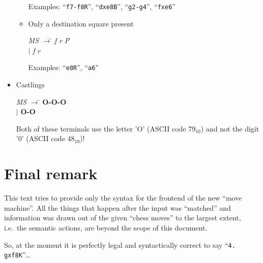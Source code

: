 \documentclass[a4paper]{article}
\def\base#1{$_{\scriptscriptstyle #1}$}
\def\bnf#1{\textit{#1}}
\def\bnfterm#1{\textbf{#1}}
\def\bnfprod{$\rightarrow$}
\def\bnfor{$|$}
\begin{document}
\begin{itemize}
\begin{itemize}
Examples: ``\texttt{f7-f8R}'', ``\texttt{dxe8B}'', ``\texttt{g2-g4}'', 
``\texttt{fxe6}''
\item Only a destination square present

\begin{center}
\begin{minipage}{3cm}
\begin{tabbing}
\bnf{MS} \bnfprod\={} \bnf{f} \bnf{r} \bnf{P}\\
 \>\bnfor{} \bnf{f} \bnf{r}
\end{tabbing}
\end{minipage}
\end{center}

Examples: ``\texttt{e8R}'', ``\texttt{a6}''
\end{itemize}


\item Castlings

\begin{center}
\begin{minipage}{3cm}
\begin{tabbing}
\bnf{MS} \bnfprod\={} \bnfterm{O-O-O}\\
 \>\bnfor{} \bnfterm{O-O}
\end{tabbing}
\end{minipage}
\end{center}

Both of these terminals use the letter 'O' (ASCII code 
79\base{10}) and not the digit '0'
(ASCII code 48\base{10})!
\end{itemize}

\section*{Final remark}

This text tries to provide only the syntax for the frontend of the new ``move
machine''. All the things that happen after the input was ``matched'' and
information was drawn out of the given ``chess moves'' to the largest extent,
i.e.~the semantic actions, are beyond the scope of this document.

So, at the moment it is perfectly legal and syntactically correct to say
``\texttt{4. gxf8K}''\ldots
\end{document}
